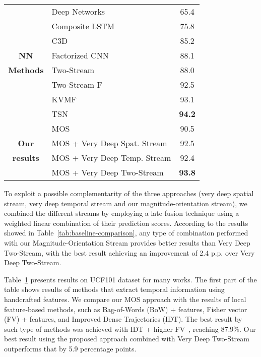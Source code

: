 \documentclass[10pt,conference]{IEEEtran}
\begin{document}
\begin{table}[!htb]
\begin{small}
\begin{tabular}{clc}
			& Deep Networks~\cite{Karpathy:2014} & \multicolumn{1}{c}{65.4} \\
			& Composite LSTM~\cite{Srivastava:2015} & \multicolumn{1}{c}{75.8} \\
			& C3D~\cite{Tran:2015} & \multicolumn{1}{c}{85.2}  \\
			\multirow{1}{*}{\textbf{NN}} & Factorized CNN~\cite{Sun:2015} & \multicolumn{1}{c}{88.1}  \\
			\multirow{1}{*}{\textbf{Methods}} & Two-Stream~\cite{Simonyan:2014} & \multicolumn{1}{c}{88.0}\\ 
			& Two-Stream F~\cite{Feichtenhofer:2016} & \multicolumn{1}{c}{92.5}  \\
			& KVMF~\cite{Zhu:2016} & \multicolumn{1}{c}{93.1} \\
			& TSN~\cite{Wang:2016} & \multicolumn{1}{c}{\textbf{94.2}} \\
			\midrule
			&\multirow{1}{*}{MOS} & \multicolumn{1}{c}{\multirow{1}{*}{{90.5}}} \\
			\multirow{1}{*}{\textbf{Our}} & \multirow{1}{*}{MOS + Very Deep Spat. Stream} & \multicolumn{1}{c}{\multirow{1}{*}{{92.5}}} \\
			\multirow{1}{*}{\textbf{results}} & \multirow{1}{*}{MOS + Very Deep Temp. Stream} & \multicolumn{1}{c}{\multirow{1}{*}{{92.4}}}  \\
			& \multirow{1}{*}{MOS + Very Deep Two-Stream} & \multicolumn{1}{c}{\multirow{1}{*}{{\textbf{93.8}}}} \\
			\bottomrule
		\end{tabular}
		\label{tab:ucf101-comparison}
	\end{small}
\end{table}

To exploit a possible complementarity of the three approaches  (very deep spatial stream, very deep temporal stream and our magnitude-orientation stream),  we combined the different streams by employing a late fusion technique using a weighted linear combination of their prediction scores. According to the results showed in Table~\ref{tab:baseline-comparison}, any type of combination performed with our Magnitude-Orientation Stream provides better results than Very Deep Two-Stream, with the best result achieving an improvement of 2.4 p.p. over Very Deep Two-Stream.



Table~\ref{tab:ucf101-comparison} presents results on UCF101 dataset for many works. The first part of the table shows results of methods that extract temporal information using handcrafted features. We compare our MOS approach with the results of local feature-based methods, such as Bag-of-Words (BoW) + features, Fisher vector (FV) + features, and Improved Dense Trajectories (IDT). The best result by such type of methods was achieved with IDT + higher FV~\cite{Peng:2016}, reaching $87.9\%$. Our best result using the proposed approach combined with Very Deep Two-Stream outperforms that by 5.9 percentage points.
\end{document}
